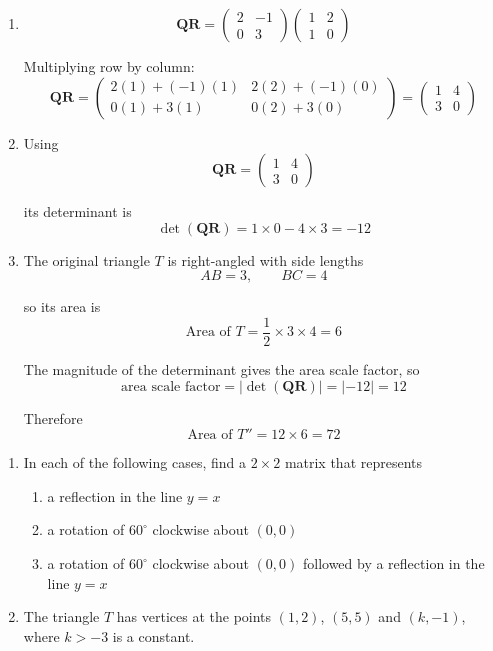 \documentclass[leqno]{article}
\begin{document}
\begin{enumerate}[
  label=\textbf{\arabic*.},
  leftmargin=*,
  topsep=0pt,
  partopsep=0pt,
  parsep=0pt
]
\begin{djsSolution}
\begin{enumerate}[label=\textbf{(\alph*)}]
  \item
  \[
  \mathbf{QR}=
  \begin{pmatrix}2&-1\\0&3\end{pmatrix}
  \begin{pmatrix}1&2\\1&0\end{pmatrix}
  \]

  Multiplying row by column:
  \[
  \mathbf{QR}=
  \begin{pmatrix}
  2(1)+(-1)(1) & 2(2)+(-1)(0)\\
  0(1)+3(1) & 0(2)+3(0)
  \end{pmatrix}
  =
  \begin{pmatrix}
  1&4\\
  3&0
  \end{pmatrix}
  \]

  \item Using
  \[
  \mathbf{QR}=\begin{pmatrix}1&4\\3&0\end{pmatrix}
  \]

  its determinant is
  \[
  \det(\mathbf{QR})=1\times 0-4\times 3=-12
  \]

  \item The original triangle \(T\) is right-angled with side lengths
  \[
  AB=3,\qquad BC=4
  \]

  so its area is
  \[
  \text{Area of }T=\frac12\times 3\times 4=6
  \]

  The magnitude of the determinant gives the area scale factor, so
  \[
  \text{area scale factor}=|\det(\mathbf{QR})|=|-12|=12
  \]

  Therefore
  \[
  \text{Area of }T''=12\times 6=72
  \]
\end{enumerate}
\end{djsSolution}


\newpage

\questionitem

\begin{enumerate}[label=\textbf{(\roman*)}]
  \item In each of the following cases, find a $2\times 2$ matrix that represents
  \begin{enumerate}[label=(\alph*)]
    \item a reflection in the line $y=x$ 
    \item a rotation of $60^\circ$ clockwise about $(0,0)$ 
    \item a rotation of $60^\circ$ clockwise about $(0,0)$ followed by a reflection in the line $y=x$  \\
  \end{enumerate}
  \item The triangle $T$ has vertices at the points $(1,2)$, $(5,5)$ and $(k,-1)$, where $k>-3$ is a constant. \\


\end{enumerate}
\end{enumerate}
\end{document}
